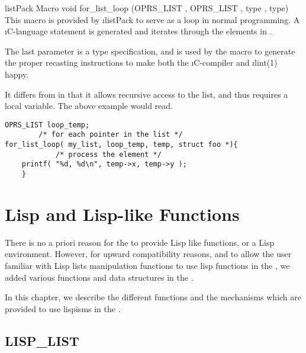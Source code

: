 \begin{typefn}{listPack Macro} {void} {for\_list\_loop} {(OPRS\_LIST , OPRS\_LIST
, type , type)}
This macro is provided by \i{listPack} to serve as a
 loop in normal programming. A \i{C}-language 
statement is generated and iterates  through the elements in
.

The last parameter is a type specification, and is used by the macro to
generate the proper recasting instructions to make both the \i{C}-compiler
and \i{lint(1)} happy.

It differs from  in that it allows recursive
access to the list, and thus requires a local variable.  The above example
would read.
\begin{verbatim}
OPRS_LIST loop_temp;
        /* for each pointer in the list */
for_list_loop( my_list, loop_temp, temp, struct foo *){
            /* process the element */
    printf( "%d, %d\n", temp->x, temp->y );
    }
\end{verbatim}
\end{typefn}

\chapter{Lisp and Lisp-like Functions}

There is no a priori reason for the \COPRSDE{} to provide Lisp like functions,
or a Lisp environment. However, for upward compatibility reasons, and to allow
the user familiar with Lisp lists manipulation functions to use lisp functions
in the \CPK{}, we added various functions and data structures in the \COPRSDE{}.

In this chapter, we describe the different functions and the mechanisms which
are provided to use lispisms in the \COPRSDE{}.



\section{LISP\_LIST}


